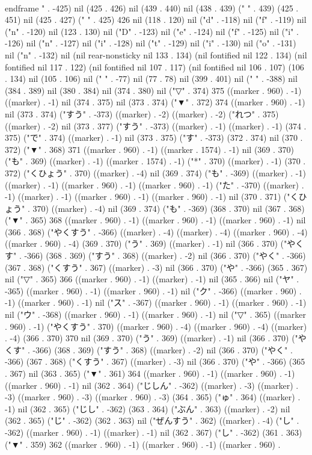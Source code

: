 {\\end{frame}
" . -425) nil (425 . 426) nil (439 . 440) nil (438 . 439) (" " . 439) (425 . 451) nil (425 . 427) (" " . 425) 426 nil (118 . 120) nil ("d" . -118) nil ("f" . -119) nil ("n" . -120) nil (123 . 130) nil ("D" . -123) nil ("e" . -124) nil ("f" . -125) nil ("i" . -126) nil ("n" . -127) nil ("i" . -128) nil ("t" . -129) nil ("i" . -130) nil ("o" . -131) nil ("n" . -132) nil (nil rear-nonsticky nil 133 . 134) (nil fontified nil 122 . 134) (nil fontified nil 117 . 122) (nil fontified nil 107 . 117) (nil fontified nil 106 . 107) (106 . 134) nil (105 . 106) nil (" " . -77) nil (77 . 78) nil (399 . 401) nil (" " . -388) nil (384 . 389) nil (380 . 384) nil (374 . 380) nil ("▽" . 374) 375 ((marker . 960) . -1) ((marker) . -1) nil (374 . 375) nil (373 . 374) ("▼" . 372) 374 ((marker . 960) . -1) nil (373 . 374) ("すう" . -373) ((marker) . -2) ((marker) . -2) ("れつ" . 375) ((marker) . -2) nil (373 . 377) ("すう" . -373) ((marker) . -1) ((marker) . -1) (374 . 375) ("で" . 374) ((marker) . -1) nil (373 . 375) ("す" . -373) (372 . 374) nil (370 . 372) ("▼" . 368) 371 ((marker . 960) . -1) ((marker . 1574) . -1) nil (369 . 370) ("も" . 369) ((marker) . -1) ((marker . 1574) . -1) ("*" . 370) ((marker) . -1) (370 . 372) ("くひょう" . 370) ((marker) . -4) nil (369 . 374) ("も" . -369) ((marker) . -1) ((marker) . -1) ((marker . 960) . -1) ((marker . 960) . -1) ("た" . -370) ((marker) . -1) ((marker) . -1) ((marker . 960) . -1) ((marker . 960) . -1) nil (370 . 371) ("くひょう" . 370) ((marker) . -4) nil (369 . 374) ("も" . -369) (368 . 370) nil (367 . 368) ("▼" . 365) 368 ((marker . 960) . -1) ((marker . 960) . -1) ((marker . 960) . -1) nil (366 . 368) ("やくすう" . -366) ((marker) . -4) ((marker) . -4) ((marker . 960) . -4) ((marker . 960) . -4) (369 . 370) ("う" . 369) ((marker) . -1) nil (366 . 370) ("やくす" . -366) (368 . 369) ("すう" . 368) ((marker) . -2) nil (366 . 370) ("やく" . -366) (367 . 368) ("くすう" . 367) ((marker) . -3) nil (366 . 370) ("や" . -366) (365 . 367) nil ("▽" . 365) 366 ((marker . 960) . -1) ((marker) . -1) nil (365 . 366) nil ("ヤ" . -365) ((marker . 960) . -1) ((marker . 960) . -1) nil ("ク" . -366) ((marker . 960) . -1) ((marker . 960) . -1) nil ("ス" . -367) ((marker . 960) . -1) ((marker . 960) . -1) nil ("ウ" . -368) ((marker . 960) . -1) ((marker . 960) . -1) nil ("▽" . 365) ((marker . 960) . -1) ("やくすう" . 370) ((marker . 960) . -4) ((marker . 960) . -4) ((marker) . -4) (366 . 370) 370 nil (369 . 370) ("う" . 369) ((marker) . -1) nil (366 . 370) ("やくす" . -366) (368 . 369) ("すう" . 368) ((marker) . -2) nil (366 . 370) ("やく" . -366) (367 . 368) ("くすう" . 367) ((marker) . -3) nil (366 . 370) ("や" . -366) (365 . 367) nil (363 . 365) ("▼" . 361) 364 ((marker . 960) . -1) ((marker . 960) . -1) ((marker . 960) . -1) nil (362 . 364) ("じしん" . -362) ((marker) . -3) ((marker) . -3) ((marker . 960) . -3) ((marker . 960) . -3) (364 . 365) ("ゅ" . 364) ((marker) . -1) nil (362 . 365) ("じし" . -362) (363 . 364) ("ぶん" . 363) ((marker) . -2) nil (362 . 365) ("じ" . -362) (362 . 363) nil ("ぜんすう" . 362) ((marker) . -4) ("し" . -362) ((marker . 960) . -1) ((marker) . -1) nil (362 . 367) ("し" . -362) (361 . 363) ("▼" . 359) 362 ((marker . 960) . -1) ((marker . 960) . -1) ((marker . 960) . }
